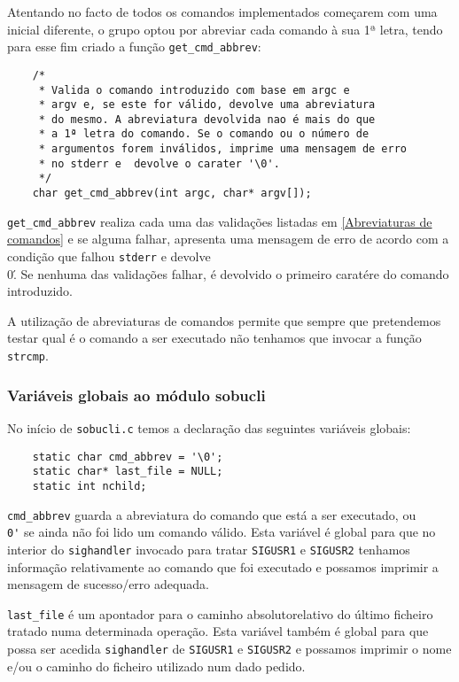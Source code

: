 \documentclass[a4paper,12pt,titlepage,portuguese]{article}
\begin{document}
Atentando no facto de todos os comandos implementados começarem com uma inicial diferente, o grupo optou por abreviar cada comando à sua 1ª letra, tendo para esse fim criado a função \texttt{get\_cmd\_abbrev}:

	\begin{verbatim}
	/* 
 	 * Valida o comando introduzido com base em argc e 
 	 * argv e, se este for válido, devolve uma abreviatura 
 	 * do mesmo. A abreviatura devolvida nao é mais do que
 	 * a 1ª letra do comando. Se o comando ou o número de
 	 * argumentos forem inválidos, imprime uma mensagem de erro 
 	 * no stderr e  devolve o carater '\0'.
 	 */
	char get_cmd_abbrev(int argc, char* argv[]);
	\end{verbatim}
\texttt{get\_cmd\_abbrev} realiza cada uma das validações listadas em \ref{Abreviaturas de comandos} e se alguma falhar, apresenta uma mensagem de erro de acordo com a condição que falhou \texttt{stderr} e devolve \'\\0\'. Se nenhuma das validações falhar, é devolvido o primeiro caratére do comando introduzido. 

A utilização de abreviaturas de comandos permite que sempre que pretendemos testar qual é o comando a ser executado não tenhamos que invocar a função \texttt{strcmp}.

\subsubsection{Variáveis globais ao módulo sobucli}

No início de \texttt{sobucli.c} temos a declaração das seguintes variáveis globais:

	\begin{verbatim}
	static char cmd_abbrev = '\0';
	static char* last_file = NULL;
	static int nchild;
	\end{verbatim}
\texttt{cmd\_abbrev} guarda a abreviatura do comando que está a ser executado, ou \texttt{\'\\0\'} se ainda não foi lido um comando válido. Esta variável é global para que no interior do \texttt{sighandler} invocado para tratar \texttt{SIGUSR1} e \texttt{SIGUSR2} tenhamos informação relativamente ao comando que foi executado e possamos imprimir a mensagem de sucesso/erro adequada. 

\texttt{last\_file} é um apontador para o caminho absoluto\/relativo do último ficheiro tratado numa determinada operação. Esta variável também é global para que possa ser acedida \texttt{sighandler} de \texttt{SIGUSR1} e \texttt{SIGUSR2} e possamos imprimir o nome e/ou o caminho do ficheiro utilizado num dado pedido.
\end{document}
